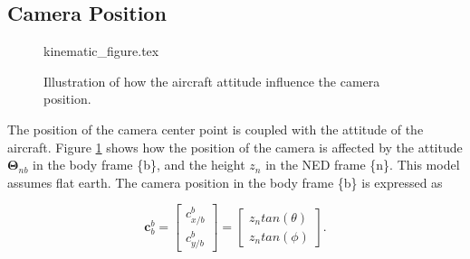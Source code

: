 



\subsection{Camera Position}

\begin{figure}
	{kinematic_figure.tex}
	\caption{Illustration of how the aircraft attitude influence the camera position.}
	\label{fig:camera_kinematics}
\end{figure}
	
The position of the camera center point is coupled with the attitude of the aircraft. Figure \ref{fig:camera_kinematics} shows how the position of the camera is affected by the attitude $\bm{\Theta}_{nb}$ in the body frame \{b\}, and the height $z_n$ in the NED frame \{n\}. This model assumes flat earth. The camera position in the body frame \{b\} is expressed as

\begin{equation} \label{eq:camera_pos}
	\bm{c}_b^b =
	\begin{bmatrix}
		c_{x/b}^b \\
		c_{y/b}^b
	\end{bmatrix}
	=
	\begin{bmatrix}
		z_n tan(\theta) \\
		z_n tan(\phi)
	\end{bmatrix}.
\end{equation}

